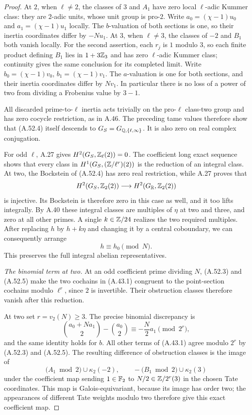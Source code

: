 \begin{proof}
At $2$, when $\ell\ne2$, the classes of $3$ and $A_1$ have
zero local $\ell$-adic Kummer class: they are $2$-adic units,
whose unit group is pro-$2$.  Write
$a_0=(\chi-1)u_0$ and $a_1=(\chi-1)u_1$ locally.
The $b$-valuation of both sections is one, so their inertia
coordinates differ by $-Nu_1$.
At $3$, when $\ell\ne3$, the classes of $-2$ and $B_1$
both vanish locally.  For the second assertion, each $r_j$
is $1$ modulo $3$, so each finite product defining $B_1$
lies in $1+3\mathbb Z_3$ and has zero $\ell$-adic Kummer class;
continuity gives the same conclusion for its completed limit.
Write $b_0=(\chi-1)v_0$, $b_1=(\chi-1)v_1$.
The $a$-valuation is one for both sections, and their inertia
coordinates differ by $Nv_1$.  In particular there is no
loss of a power of two from dividing a Frobenius value by
$3-1$.

All discarded prime-to-$\ell$ inertia acts trivially on the
pro-$\ell$ class-two group and has zero cocycle restriction,
as in A.46.  The preceding tame values therefore show that
(A.52.4) itself descends to
$G_S=G_{\mathbb Q,\{\ell,\infty\}}$.  It is also zero on real
complex conjugation.

For odd $\ell$, A.27 gives $H^2(G_S,\mathbb Z_\ell(2))=0$.
The coefficient long exact sequence shows that every class
in $H^1(G_S,(\mathbb Z/\ell^r)(2))$ is the reduction of an
integral class.  At two, the Bockstein of (A.52.4) has zero
real restriction, while A.27 proves that
\[
 H^2(G_S,\mathbb Z_2(2))\longrightarrow H^2(G_\mathbb R,\mathbb Z_2(2))
\]
is injective.  Its Bockstein is therefore zero in this case
as well, and it too lifts integrally.  By A.40 these integral
classes are multiples of $\eta$ at two and three, and zero
at all other primes.  A single $k\in\mathbb Z/24$ realizes the two
required multiples.  After replacing $h$ by $h+k\eta$ and
changing it by a central coboundary, we can consequently arrange
\[
                              h\equiv h_0\pmod N.
 \tag{A.52.5}
\]
This preserves the full integral abelian representatives.

\emph{The binomial term at two.}
At an odd coefficient prime dividing $N$, (A.52.3) and
(A.52.5) make the two cochains in (A.43.1) congruent to the
point-section cochains modulo $\ell^r$, since $2$ is invertible.
Their obstruction classes therefore vanish after this reduction.

At two set $r=v_2(N)\ge3$.  The precise binomial discrepancy is
\[
 \binom{a_0+Na_1}{2}-\binom{a_0}{2}
                   \equiv-\frac N2a_1\pmod{2^r},
 \tag{A.52.6}
\]
and the same identity holds for $b$.
All other terms of (A.43.1) agree modulo $2^r$ by
(A.52.3) and (A.52.5).  The resulting difference of obstruction
classes is the image of
\[
 \bigl(A_1\bmod2\bigr)\cup\kappa_2(-2),\qquad
 -\bigl(B_1\bmod2\bigr)\cup\kappa_2(3)
 \tag{A.52.7}
\]
under the coefficient map sending $1\in\mathbb F_2$ to
$N/2\in\mathbb Z/2^r(3)$ in the chosen Tate coordinates.
This map is Galois-equivariant, because its image has order
two; the appearances of different Tate weights modulo two
therefore give this exact coefficient map.


\end{proof}
